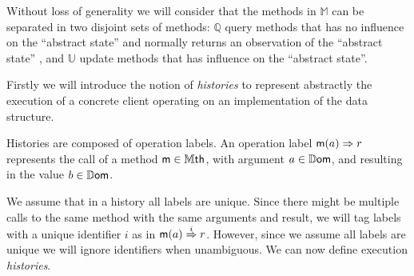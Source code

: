 

Without loss of generality we will consider that the methods in $\mathbb{M}$ can be separated in two disjoint sets of methods: $\mathbb{Q}$ query methods that has no influence on the ``abstract state'' and normally returns an observation of the ``abstract state'' , and $\mathbb{U}$ update methods that has influence on the ``abstract state''. %

Firstly we will introduce the notion of \emph{histories} to represent
abstractly the execution of a concrete client operating on an
implementation of the data structure.

Histories are composed of operation labels.
An operation label $\mathsf{m}(a) \Rightarrow r$ represents the call of a method
$\mathsf{m} \in \mathbb{M}\mathsf{th}$, with argument $a \in \mathbb{D}\mathsf{om}$, and
resulting in the value $b \in \mathbb{D}\mathsf{om}$.

We assume that in a history all labels are unique.
Since there might be multiple calls to the same method with the same
arguments and result, we will tag labels with a unique identifier $i$
as in $\mathsf{m}(a) \overset{i}{\Rightarrow} r$.
However, since we assume all labels are unique we will ignore
identifiers when unambiguous.
We can now define execution \emph{histories}.



